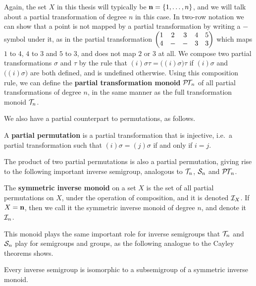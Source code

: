 Again, the set $X$ in this thesis will typically be $\mathbf{n} = \{1, \ldots, n\}$,
and we will talk about a partial transformation of degree $n$ in this case.  In
two-row notation we can show that a point is not mapped by a partial
transformation by writing a $-$ symbol under it, as in the partial
transformation $\begin{pmatrix} 1 & 2 & 3 & 4 & 5 \\ 4 & - & - & 3 & 3 \end{pmatrix}$ which maps $1$ to $4$, $4$ to $3$ and $5$ to $3$,
and does not map $2$ or $3$ at all.  We compose two partial transformations
$\sigma$ and $\tau$ by the rule that $(i)\sigma\tau = \big((i)\sigma\big)\tau$
if $(i)\sigma$ and $\big((i)\sigma\big)$ are both defined, and is undefined
otherwise.  Using this composition rule, we can define the \textbf{partial
  transformation monoid} $\mathcal{P\!T\!}_n$ of all partial transformations of degree $n$,
in the same manner as the full transformation monoid $\mathcal{T}_n$.

We also have a partial counterpart to permutations, as follows.

\begin{definition}
  \label{def:partial-perm}
  A \textbf{partial permutation} is a partial transformation that is injective,
  i.e.~a partial transformation such that $(i)\sigma=(j)\sigma$ if and only if
  $i=j$.
\end{definition}

The product of two partial permutations is also a partial permutation, giving
rise to the following important inverse semigroup, analogous to $\mathcal{T}_n$, $\mathcal{S}_n$
and $\mathcal{P\!T\!}_n$.

\begin{definition}
  \label{def:in}
  The \textbf{symmetric inverse monoid} on a set $X$ is the set of all partial
  permutations on $X$, under the operation of composition, and it is denoted
  $\mathcal{I}_X$.  If $X = \mathbf{n}$, then we call it the symmetric inverse monoid of degree
  $n$, and denote it $\mathcal{I}_n$.
\end{definition}

This monoid plays the same important role for inverse semigroups that $\mathcal{T}_n$ and
$\mathcal{S}_n$ play for semigroups and groups, as the following analogue to the Cayley
theorems shows.

\begin{theorem}
  \label{thm:wagner-preston}
  Every inverse semigroup is isomorphic to a subsemigroup of a symmetric inverse
  monoid.
\end{theorem}

